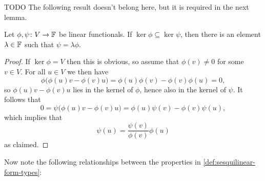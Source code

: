 TODO The following result doesn't belong here, but it is required in the next lemma.

\begin{lemma}
    \label{lem:functionals-same-kernel}
    Let $\phi,\psi \colon V \to \fieldF$ be linear functionals. If $\ker\phi \subseteq \ker\psi$, then there is an element $\lambda \in \mathbb{F}$ such that $\psi = \lambda\phi$.
\end{lemma}

\begin{proof}
    If $\ker\phi = V$ then this is obvious, so assume that $\phi(v) \neq 0$ for some $v \in V$. For all $u \in V$ we then have
    \begin{equation*}
        \phi \big( \phi(u)v - \phi(v)u \big)
            = \phi(u)\phi(v) - \phi(v)\phi(u) = 0,
    \end{equation*}
    so $\phi(u)v - \phi(v)u$ lies in the kernel of $\phi$, hence also in the kernel of $\psi$. It follows that
    \begin{equation*}
        0
            = \psi \big( \phi(u)v - \phi(v)u \big)
            = \phi(u)\psi(v) - \phi(v)\psi(u),
    \end{equation*}
    which implies that
    \begin{equation*}
        \psi(u) = \frac{\psi(v)}{\phi(v)} \phi(u)
    \end{equation*}
    as claimed.
\end{proof}



Now note the following relationships between the properties in \cref{def:sesquilinear-form-types}:

